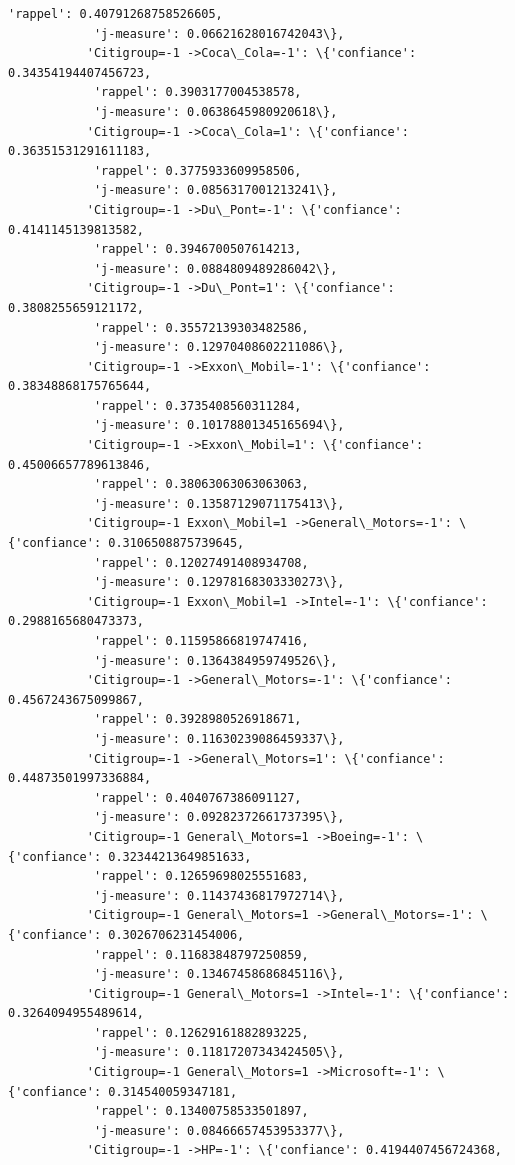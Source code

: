 \documentclass[11pt]{article}
\begin{document}
\begin{Verbatim}[commandchars=\\\{\}]
            'rappel': 0.40791268758526605,
            'j-measure': 0.06621628016742043\},
           'Citigroup=-1 ->Coca\_Cola=-1': \{'confiance': 0.34354194407456723,
            'rappel': 0.3903177004538578,
            'j-measure': 0.0638645980920618\},
           'Citigroup=-1 ->Coca\_Cola=1': \{'confiance': 0.36351531291611183,
            'rappel': 0.3775933609958506,
            'j-measure': 0.0856317001213241\},
           'Citigroup=-1 ->Du\_Pont=-1': \{'confiance': 0.4141145139813582,
            'rappel': 0.3946700507614213,
            'j-measure': 0.0884809489286042\},
           'Citigroup=-1 ->Du\_Pont=1': \{'confiance': 0.3808255659121172,
            'rappel': 0.35572139303482586,
            'j-measure': 0.12970408602211086\},
           'Citigroup=-1 ->Exxon\_Mobil=-1': \{'confiance': 0.38348868175765644,
            'rappel': 0.3735408560311284,
            'j-measure': 0.10178801345165694\},
           'Citigroup=-1 ->Exxon\_Mobil=1': \{'confiance': 0.45006657789613846,
            'rappel': 0.38063063063063063,
            'j-measure': 0.13587129071175413\},
           'Citigroup=-1 Exxon\_Mobil=1 ->General\_Motors=-1': \{'confiance': 0.3106508875739645,
            'rappel': 0.12027491408934708,
            'j-measure': 0.12978168303330273\},
           'Citigroup=-1 Exxon\_Mobil=1 ->Intel=-1': \{'confiance': 0.2988165680473373,
            'rappel': 0.11595866819747416,
            'j-measure': 0.1364384959749526\},
           'Citigroup=-1 ->General\_Motors=-1': \{'confiance': 0.4567243675099867,
            'rappel': 0.3928980526918671,
            'j-measure': 0.11630239086459337\},
           'Citigroup=-1 ->General\_Motors=1': \{'confiance': 0.44873501997336884,
            'rappel': 0.4040767386091127,
            'j-measure': 0.09282372661737395\},
           'Citigroup=-1 General\_Motors=1 ->Boeing=-1': \{'confiance': 0.32344213649851633,
            'rappel': 0.12659698025551683,
            'j-measure': 0.11437436817972714\},
           'Citigroup=-1 General\_Motors=1 ->General\_Motors=-1': \{'confiance': 0.3026706231454006,
            'rappel': 0.11683848797250859,
            'j-measure': 0.13467458686845116\},
           'Citigroup=-1 General\_Motors=1 ->Intel=-1': \{'confiance': 0.3264094955489614,
            'rappel': 0.12629161882893225,
            'j-measure': 0.11817207343424505\},
           'Citigroup=-1 General\_Motors=1 ->Microsoft=-1': \{'confiance': 0.314540059347181,
            'rappel': 0.13400758533501897,
            'j-measure': 0.08466657453953377\},
           'Citigroup=-1 ->HP=-1': \{'confiance': 0.4194407456724368,

\end{Verbatim}
\end{document}
